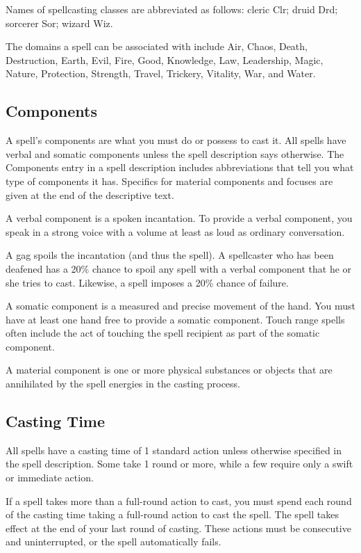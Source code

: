 Names of spellcasting classes are abbreviated as follows: cleric Clr; druid Drd; sorcerer Sor; wizard Wiz.

The domains a spell can be associated with include Air, Chaos, Death, Destruction, Earth, Evil, Fire, Good, Knowledge, Law, Leadership, Magic, Nature, Protection, Strength, Travel, Trickery, Vitality, War, and Water.

\subsection{Components}
A spell's components are what you must do or possess to cast it. All spells have verbal and somatic components unless the spell description says otherwise. The Components entry in a spell description includes abbreviations that tell you what type of components it has. Specifics for material components and focuses are given at the end of the descriptive text.

 A verbal component is a spoken incantation. To provide a verbal component, you speak in a strong voice with a volume at least as loud as ordinary conversation.

A gag spoils the incantation (and thus the spell). A spellcaster who has been deafened has a 20\% chance to spoil any spell with a verbal component that he or she tries to cast. Likewise, a  spell imposes a 20\% chance of failure.

 A somatic component is a measured and precise movement of the hand. You must have at least one hand free to provide a somatic component. Touch range spells often include the act of touching the spell recipient as part of the somatic component.

 A material component is one or more physical substances or objects that are annihilated by the spell energies in the casting process.

\subsection{Casting Time}
All spells have a casting time of 1 standard action unless otherwise specified in the spell description. Some take 1 round or more, while a few require only a swift or immediate action.

If a spell takes more than a full-round action to cast, you must spend each round of the casting time taking a full-round action to cast the spell. The spell takes effect at the end of your last round of casting. These actions must be consecutive and uninterrupted, or the spell automatically fails.

